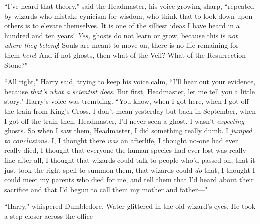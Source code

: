 ``I've heard that theory," said the Headmaster, his voice growing sharp, ``repeated by wizards who mistake cynicism for wisdom, who think that to look down upon others is to elevate themselves. It is one of the silliest ideas I have heard in a hundred and ten years! \emph{Yes,} ghosts do not learn or grow, because this is \emph{not where they belong}! Souls are meant to move on, there is no life remaining for them \emph{here}! And if not ghosts, then what of the Veil? What of the Resurrection Stone?"

``All right," Harry said, trying to keep his voice calm, ``I'll hear out your evidence, because \emph{that's what a scientist does}. But first, Headmaster, let me tell you a little story." Harry's voice was trembling. ``You know, when I got here, when I got off the train from King's Cross, I don't mean yesterday but back in September, when I got off the train then, Headmaster, I'd never seen a ghost. I wasn't \emph{expecting} ghosts. So when I saw them, Headmaster, I did something really dumb. I \emph{jumped to conclusions}. I, I thought there \emph{was} an afterlife, I thought no-one had ever really died, I thought that everyone the human species had ever lost was really fine after all, I thought that wizards could talk to people who'd passed on, that it just took the right spell to summon them, that wizards could \emph{do} that, I thought I could meet my parents who died for me, and tell them that I'd heard about their sacrifice and that I'd begun to call them my mother and father—"

``Harry," whispered Dumbledore. Water glittered in the old wizard's eyes. He took a step closer across the office—

